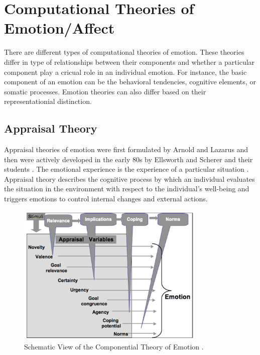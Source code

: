 \documentclass[11pt]{article}
\begin{document}
\section{Computational Theories of Emotion/Affect}
\label{sec:emotion-theories}

There are different types of computational theories of emotion. These theories
differ in type of relationships between their components and whether a
particular component play a cricual role in an individual emotion. For instance,
the basic component of an emotion can be the behavioral tendencies, cognitive
elements, or somatic processes. Emotion theories can also differ based on their
representationial distinction.

\subsection{Appraisal Theory}
\label{sec:appraisal-theory}

Appraisal theories of emotion were first formulated by Arnold
\cite{arnold:emotion-personality} and Lazarus \cite{lazarus:emotion-adaptation}
and then were actively developed in the early 80s by Ellsworth and Scherer and
their students \cite{roseman:appraisal-theory}
\cite{sander:systems-approach-appraisal} \cite{scherer:nature-function-emotion}
\cite{scherer:appraisal-processes} \cite{scherer:emotions-emergent}. The
emotional experience is the experience of a particular situation
\cite{frijda:emotions}. Appraisal theory describes the cognitive process by
which an individual evaluates the situation in the environment with respect to
the individual's well-being and triggers emotions to control internal changes
and external actions.

\begin{figure}[tbh]
  \center
  \includegraphics[width=0.8\textwidth]{figure/cpm.png}
  \caption{Schematic View of the Componential Theory of Emotion
  \cite{hudlicka:guidelines-emotions}.}
  \label{fig:cpm}
\end{figure}
\end{document}
